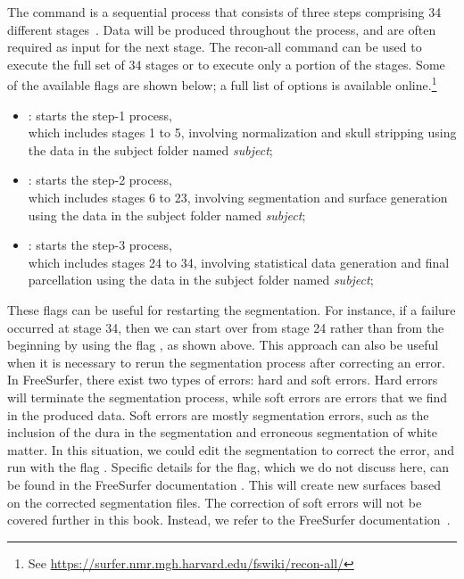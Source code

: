The command  is a sequential process that consists of
three steps comprising 34 different
stages~\cite{freesurfer-wiki}. Data will be produced throughout the
process, and are often required as input for the next stage. The
recon-all command can be used to execute the full set of 34 stages or
to execute only a portion of the stages. Some of the available
 flags are shown below; a full list of options is
available online.\footnote{See
  \url{https://surfer.nmr.mgh.harvard.edu/fswiki/recon-all/}}
\begin{itemize}
\item {}: starts the step-1 process,\\ which includes stages 1 to 5, involving normalization and skull stripping using the data in the subject folder named \textit{subject}; 
\item {}: starts the step-2 process,\\ which includes stages 6 to 23, involving segmentation and surface generation using the data in the subject folder named \textit{subject};
\item {}: starts the step-3 process,\\ which includes stages 24 to 34, involving statistical data generation and final parcellation using the data in the subject folder named \textit{subject};
\end{itemize} 

These flags can be useful for restarting the segmentation. For
instance, if a failure occurred at stage 34, then we can start over
from stage 24 rather than from the beginning by using the flag
, as shown above. This approach can also be useful
when it is necessary to rerun the segmentation process after
correcting an error. In FreeSurfer, there exist two types of errors:
hard and soft errors. Hard errors will terminate the segmentation
process, while soft errors are errors that we find in the produced
data. Soft errors are mostly segmentation errors, such as the
inclusion of the dura in the segmentation and erroneous segmentation
of white matter. In this situation, we could edit the segmentation to
correct the error, and run  with the flag
. Specific details for the
 flag, which we do not discuss here, can be
found in the FreeSurfer documentation \cite{freesurfer-wiki}. This
will create new surfaces based on the corrected segmentation
files. The correction of soft errors will not be covered further in
this book. Instead, we refer to the FreeSurfer
documentation~\cite{freesurfer-wiki}.

